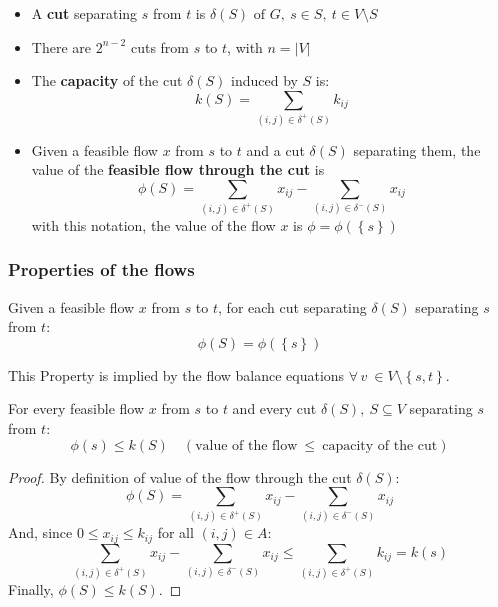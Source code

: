 \documentclass[english]{article}
\begin{document}
\begin{itemize}
  \item A \textbf{cut} separating \(s\) from \(t\) is \(\delta(S) \text{ of } G, \ s \in S, \ t \in V \setminus S\)
  \item There are \(2^{n-2}\) cuts from \(s\) to \(t\), with \(n = |V|\)
  \item The \textbf{capacity} of the cut \(\delta(S)\) induced by \(S\) is: \[ k(S) = \displaystyle \sum_{\left( i, j \right) \in \delta^+(S)} k_{ij} \]
  \item Given a feasible flow \(x\) from \(s\) to \(t\) and a cut \(\delta(S)\) separating them, the value of the \textbf{feasible flow through the cut} is \[\phi(S) = \displaystyle \sum_{\left( i, j \right) \in \delta^+(S)} x_{ij} - \sum_{\left( i, j \right) \in \delta^-(S)} x_{ij}\]
        with this notation, the value of the flow \(x\) is \(\phi = \phi\left( \left\{ s \right\} \right)\)
\end{itemize}

\subsubsection{Properties of the flows}

\begin{property}
  Given a feasible flow \(x\) from \(s\) to \(t\), for each cut separating \(\delta(S)\) separating \(s\) from \(t\):
  \[ \phi(S) = \phi\left( \left\{ s \right\} \right) \]

  This Property is implied by the flow balance equations \(\forall \, v \ \in V \setminus \left\{ s, t \right\}\).
\end{property}

\begin{property}
  \label{prop:weak-duality}
  For every feasible flow \(x\) from \(s\) to \(t\) and every cut \(\delta(S), \ S \subseteq V\) separating \(s\) from \(t\):
  \[ \phi(s) \leq k(S) \quad \left( \text{value of the flow} \ \leq \ \text{capacity of the cut} \right)\]
\end{property}

\begin{proof}
  By definition of value of the flow through the cut \(\delta(S)\):
  \[ \phi(S) = \displaystyle \sum_{\left( i, j \right) \in \delta^+(S)} x_{ij} - \sum_{\left( i, j \right) \in \delta^-(S)} x_{ij} \]
  And, since \(0 \leq x_{ij} \leq k_{ij}\) for all \(\left( i, j \right) \in A\):
  \[ \displaystyle \sum_{\left( i, j \right) \in \delta^+(S)} x_{ij} - \sum_{\left( i, j \right) \in \delta^-(S)} x_{ij} \leq \displaystyle \sum_{\left( i, j \right) \in \delta^+(S)} k_{ij} = k(s) \]
  Finally, \(\phi(S) \leq k(S)\).
\end{proof}
\end{document}
